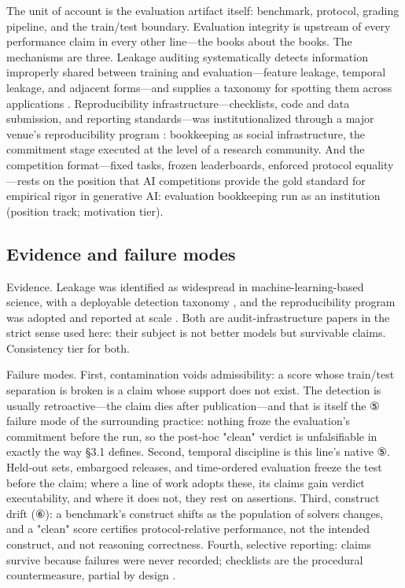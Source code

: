 \documentclass[11pt,a4paper]{article}
\begin{document}
The unit of account is the evaluation artifact itself: benchmark, protocol, grading pipeline, and the train/test boundary. Evaluation integrity is upstream of every performance claim in every other line—the books about the books. The mechanisms are three. Leakage auditing systematically detects information improperly shared between training and evaluation—feature leakage, temporal leakage, and adjacent forms—and supplies a taxonomy for spotting them across applications \cite{key07}. Reproducibility infrastructure—checklists, code and data submission, and reporting standards—was institutionalized through a major venue's reproducibility program \cite{key08}: bookkeeping as social infrastructure, the commitment stage executed at the level of a research community. And the competition format—fixed tasks, frozen leaderboards, enforced protocol equality—rests on the position that AI competitions provide the gold standard for empirical rigor in generative AI: evaluation bookkeeping run as an institution \cite{key35} (position track; motivation tier).

\subsection{Evidence and failure modes}

Evidence. Leakage was identified as widespread in machine-learning-based science, with a deployable detection taxonomy \cite{key07}, and the reproducibility program was adopted and reported at scale \cite{key08}. Both are audit-infrastructure papers in the strict sense used here: their subject is not better models but survivable claims. Consistency tier for both.

Failure modes. First, contamination voids admissibility: a score whose train/test separation is broken is a claim whose support does not exist. The detection is usually retroactive—the claim dies after publication—and that is itself the ⑤ failure mode of the surrounding practice: nothing froze the evaluation's commitment before the run, so the post-hoc "clean" verdict is unfalsifiable in exactly the way §3.1 defines. Second, temporal discipline is this line's native ⑤. Held-out sets, embargoed releases, and time-ordered evaluation freeze the test before the claim; where a line of work adopts these, its claims gain verdict executability, and where it does not, they rest on assertions. Third, construct drift (⑥): a benchmark's construct shifts as the population of solvers changes, and a "clean" score certifies protocol-relative performance, not the intended construct, and not reasoning correctness. Fourth, selective reporting: claims survive because failures were never recorded; checklists are the procedural countermeasure, partial by design \cite{key08}.
\end{document}
